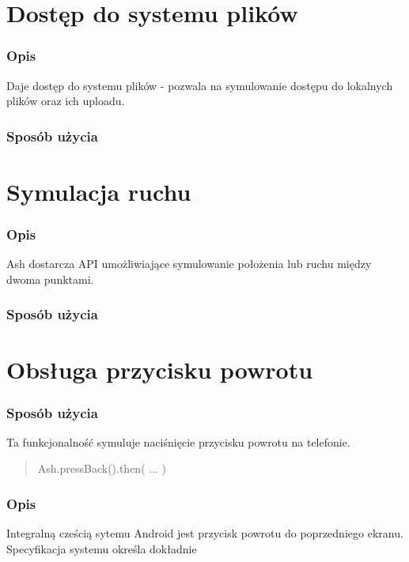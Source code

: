 \documentclass[brudnopis]{xmgr}
\begin{document}
\section{Dostęp do systemu plików}

\subsubsection{Opis}
Daje dostęp do systemu plików - pozwala na symulowanie dostępu do lokalnych plików oraz ich uploadu.

\subsubsection{Sposób użycia}

\section{Symulacja ruchu}

\subsubsection{Opis}
Ash dostarcza API umożliwiające symulowanie położenia lub ruchu między dwoma punktami.

\subsubsection{Sposób użycia}

\section{Obsługa przycisku powrotu}

\subsubsection{Sposób użycia}
Ta funkcjonalność symuluje naciśnięcie przycisku powrotu na telefonie. 

\begin{quote}
Ash.pressBack().then( ... ) 
\end{quote}

\subsubsection{Opis}

Integralną cześcią sytemu Android jest przycisk powrotu do poprzedniego ekranu. Specyfikacja systemu określa dokładnie
\end{document}
